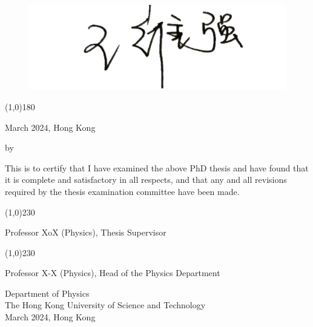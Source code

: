\begin{figure}[h]
	\centering
	\includegraphics[scale=.30]{includes/sign.png}
\end{figure}
\begin{center}
	\vspace*{-1.9cm}
	\line(1,0){180}
	\smallskip
	
	\thesisWriter{}
	
	March 2024, Hong Kong
\end{center}

\newpage

\null\vspace{0.4cm}
\begin{center}
	{\Large\bf \ThesisTitle{}}
	\vspace{1.5cm}
	
	{by}\smallskip
	
	{\thesisWriter{}}\normalsize
	
	\vspace{1cm}
	
	This is to certify that I have examined the above PhD thesis and have found that it is complete and satisfactory in all respects, and that any and all revisions required by the thesis examination committee have been made.
	
	\vspace{1.5cm}
	
	\line(1,0){230} 
	
	Professor XoX (Physics), Thesis Supervisor
	
	\vspace{1.5cm}
	
	\line(1,0){230} 
	
	Professor X-X (Physics), Head of the Physics Department
	
	\vspace{2cm}
	Department of Physics \\
	The Hong Kong University of Science and Technology \\
	March 2024, Hong Kong
\end{center}




